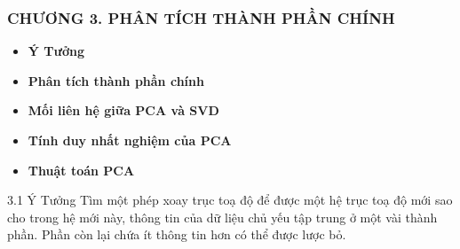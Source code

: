 \documentclass[notheorems,envcountsect,hyperref=unicode]{beamer}
\newcommand{\R}{\mathbb R}
\newcommand{\N}{\mathbb N}
\def\A{\mathcal{A}}
\def\R{\mathbb{R}}
\def\N{\mathbb{N}}
\def\lp{\ell_p}
\def\lq{\ell_q}
\def\Lp{\mathbf{L_p}}
\def\Lo{\mathbf{L_{\infty}}}
\def\m{\mu}
\def\dissum{\displaystyle\sum}
\def\kgdd{(X,\A,\mu)}
\begin{document}


\begin{frame}
	\frametitle{\MakeUppercase{\textsc\bf\large CHƯƠNG 3. Phân tích thành phần chính}}
	\renewcommand{\baselinestretch}{1.5}
	\begin{itemize}
		\item [3.1] \textbf{Ý Tưởng}
		\item [3.2] \textbf{Phân tích thành phần chính }
		\item [3.3] \textbf{Mối liên hệ giữa PCA và SVD }
		\item [3.4] \textbf{Tính duy nhất nghiệm của PCA}
		\item [3.5] \textbf{Thuật toán PCA}
	\end{itemize}
\end{frame}
\begin{frame}{3.1 Ý Tưởng }
Tìm một phép xoay trục toạ độ để được một hệ trục toạ độ mới sao cho trong hệ mới này, thông tin của dữ liệu chủ yếu tập trung ở một vài thành phần. Phần còn lại chứa ít thông tin hơn có thể được lược bỏ.
%

\end{frame}
\end{document}
